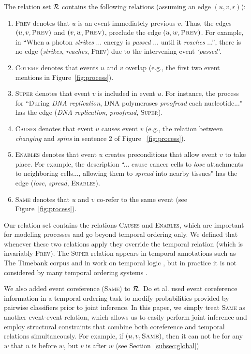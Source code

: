 The relation set $\mathcal{R}$ contains the following relations (assuming an edge $(u,v,r)$):
\begin{enumerate}[itemsep=0pt,topsep=0pt] 
\item \textsc{Prev} denotes that $u$ is an event immediately previous $v$. Thus, the edges $(u,v,\mbox{\textsc{Prev}})$ and $(v,w,\mbox{\textsc{Prev}})$, preclude the edge $(u,w,\mbox{\textsc{Prev}})$. For example, in ``When a photon \emph{strikes} ... energy is  \emph{passed} ... until it \emph{reaches} ...'', there is no edge (\emph{strikes}, \emph{reaches}, \textsc{Prev}) due to the intervening event \emph{`passed'}.
\item \textsc{Cotemp} denotes that events $u$ and $v$ overlap (e.g., the first two event mentions in Figure~\ref{fig:process}).
\item \textsc{Super} denotes that event $v$ is included in event $u$. For instance, the process for ``During \emph{DNA replication}, DNA polymerases \emph{proofread} each nucleotide..." has the edge (\emph{DNA replication}, \emph{proofread}, \textsc{Super}).
\item \textsc{Causes} denotes that event $u$ causes event $v$ (e.g., the relation between \emph{changing} and \emph{spins} in sentence 2 of Figure ~\ref{fig:process}).
\item \textsc{Enables} denotes that event $u$ creates preconditions that allow event $v$ to take place. For example, the description ``... cause cancer cells  to \emph{lose} attachments to neighboring cells..., allowing them to \emph{spread} into nearby tissues" has the edge (\emph{lose}, \emph{spread}, \textsc{Enables}).
\item \textsc{Same} denotes that $u$ and $v$ co-refer to the same event (see Figure~\ref{fig:process}).
\end{enumerate}

Our relation set contains the relations \textsc{Causes} and \textsc{Enables}, which are important for modeling processes and go beyond temporal ordering only. We defined that whenever these two relations apply they override the temporal relation (which is invariably \textsc{Prev}). The \textsc{Super} relation appears in temporal annotations such as The Timebank corpus \cite{Pustejovsky03} and in work on temporal logic \cite{Allen83}, but in practice it is not considered by many temporal ordering systems \cite{Chambers08,Yoshikawa09,Do12}. 

We also added event coreference (\textsc{Same}) to $\mathcal{R}$. Do et al.  used event coreference information in a temporal ordering task to modify probabilities provided by pairwise classifiers prior to joint inference. In this paper, we simply treat \textsc{Same} as another event-event relation, which allows us to easily perform joint inference and employ structural constraints that combine both coreference and temporal relations simultaneously. For example, if $(u,v,\mbox{\textsc{Same}})$, then it can not be for any $w$ that $u$ is before $w$, but $v$ is after $w$ (see Section~\ref{subsec:global})

